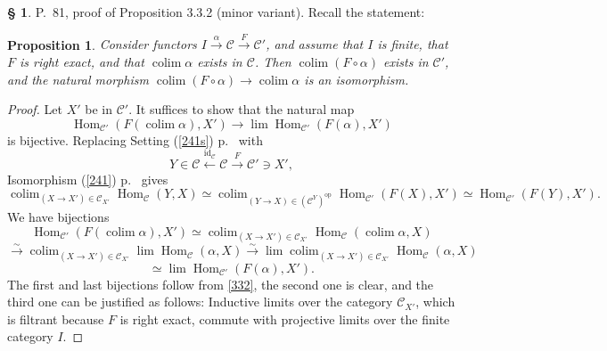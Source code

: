 \documentclass[12pt]{article}%
\newtheorem{prop}[thm]{Proposition}
\theoremstyle{remark}
\theoremstyle{definition}
\newtheorem{s}[thm]{\S}%
\newcommand{\C}{\mathcal C}
\newcommand{\xr}{\xrightarrow}
\DeclareMathOperator*{\colim}{colim}
\DeclareMathOperator{\id}{id}
\DeclareMathOperator{\Hom}{Hom}%
\DeclareMathOperator{\op}{op}
\begin{document}
\begin{s} 
P.~81, proof of Proposition 3.3.2 (minor variant). Recall the statement:
%
\begin{prop} 
%
Consider functors $I\xrightarrow\alpha\C\xrightarrow F\C'$, and assume that $I$ is finite, that $F$ is right exact, and that $\colim\alpha$ exists in $\C$. Then $\colim(F\circ\alpha)$ exists in $\C'$, and the natural morphism $\colim(F\circ\alpha)\to\colim\alpha$ is an isomorphism. 
%
\end{prop} 
%
\begin{proof}
Let $X'$ be in $\C'$. It suffices to show that the natural map 
$$
\Hom_{\C'}(F(\colim\alpha),X')\to\lim\Hom_{\C'}(F(\alpha),X')
$$ 
%
is bijective. Replacing Setting (\ref{241s}) p.~\pageref{241s} with 
$$
Y\in\C\xleftarrow{\id_\C}\C\xrightarrow{F}\C'\ni X', 
$$ 
Isomorphism (\ref{241}) p.~\pageref{241} gives 
%
\begin{equation}\label{332} 
\colim_{(X\to X')\in\C_{X'}}\Hom_\C(Y,X)\simeq\colim_{(Y\to X)\in(\C^Y)^{\op}}\Hom_{\C'}(F(X),X')\simeq\Hom_{\C'}(F(Y),X').
\end{equation} 
%
We have bijections 
$$ 
\Hom_{\C'}(F(\colim\alpha),X')\simeq\colim_{(X\to X')\in\C_{X'}}\Hom_\C(\colim\alpha,X)
$$
$$
\xr\sim\colim_{(X\to X')\in\C_{X'}}\lim\Hom_\C(\alpha,X)\xr\sim\lim\colim_{(X\to X')\in\C_{X'}}\Hom_\C(\alpha,X)
$$
$$
\simeq\lim\Hom_{\C'}(F(\alpha),X'). 
$$ 
The first and last bijections follow from \eqref{332}, the second one is clear, and the third one can be justified as follows: Inductive limits over the category $\C_{X'}$, which is filtrant because $F$ is right exact, commute with projective limits over the finite category $I$.
\end{proof}
\end{s}

%
\end{document}
